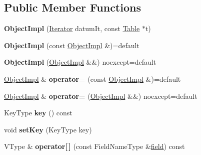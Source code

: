 \subsection*{Public Member Functions}
\begin{DoxyCompactItemize}
\item 
\mbox{\label{class_table_1_1_object_impl_a0ed19396795beaef8460a89b8c35bd22}} 
{\bfseries Object\+Impl} (\hyperlink{class_table_1_1_iterator_impl}{Iterator} datum\+It, const \hyperlink{class_table}{Table} $\ast$t)
\item 
\mbox{\label{class_table_1_1_object_impl_a0c11ee86de9e1d82a35c09874c652c8e}} 
{\bfseries Object\+Impl} (const \hyperlink{class_table_1_1_object_impl}{Object\+Impl} \&)=default
\item 
\mbox{\label{class_table_1_1_object_impl_a2aeb205c5f5e60849e44b7356a9af11c}} 
{\bfseries Object\+Impl} (\hyperlink{class_table_1_1_object_impl}{Object\+Impl} \&\&) noexcept=default
\item 
\mbox{\label{class_table_1_1_object_impl_ada0904c0c8cab5db6d0e3715e027c779}} 
\hyperlink{class_table_1_1_object_impl}{Object\+Impl} \& {\bfseries operator=} (const \hyperlink{class_table_1_1_object_impl}{Object\+Impl} \&)=default
\item 
\mbox{\label{class_table_1_1_object_impl_a2e1856b5d7f2c248587fdafa4f355564}} 
\hyperlink{class_table_1_1_object_impl}{Object\+Impl} \& {\bfseries operator=} (\hyperlink{class_table_1_1_object_impl}{Object\+Impl} \&\&) noexcept=default
\item 
\mbox{\label{class_table_1_1_object_impl_ad5686067987189713bb677162b039c3a}} 
Key\+Type {\bfseries key} () const
\item 
\mbox{\label{class_table_1_1_object_impl_a85e6b4a92387a1e45a27655457d8b09f}} 
void {\bfseries set\+Key} (Key\+Type key)
\item 
\mbox{\label{class_table_1_1_object_impl_a48dbf990928e6aeda1ba45a8428b2586}} 
V\+Type \& {\bfseries operator\mbox{[}$\,$\mbox{]}} (const Field\+Name\+Type \&\hyperlink{class_table_ab68bc133d1d01f516d0bfb1a9c06e40f}{field}) const

\end{DoxyCompactItemize}
